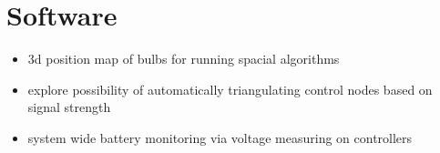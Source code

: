 \documentclass[11pt]{article}
\begin{document}
\section{Software}
\label{sec:org36218a2}
\begin{itemize}
\item 3d position map of bulbs for running spacial algorithms
\item explore possibility of automatically triangulating control nodes based on signal strength
\item system wide battery monitoring via voltage measuring on controllers
\end{itemize}
\end{document}
